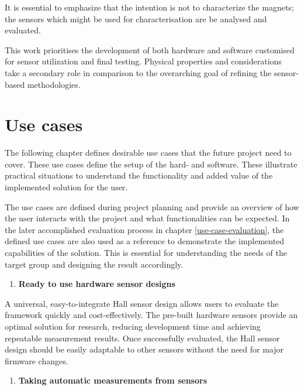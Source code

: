 It is essential to emphasize that the intention is not to characterize
the magnets; the sensors which might be used for characterisation are be
analysed and evaluated.

This work prioritises the development of both hardware and software
customised for sensor utilization and final testing. Physical properties
and considerations take a secondary role in comparison to the
overarching goal of refining the sensor-based methodologies.

\hypertarget{use-cases}{%
\section{Use cases}\label{use-cases}}

The following chapter defines desirable use cases that the future
project need to cover. These use cases define the setup of the hard- and
software. These illustrate practical situations to understand the
functionality and added value of the implemented solution for the user.

The use cases are defined during project planning and provide an
overview of how the user interacts with the project and what
functionalities can be expected. In the later accomplished evaluation
process in chapter \ref{use-case-evaluation}, the defined use cases are
also used as a reference to demonstrate the implemented capabilities of
the solution. This is essential for understanding the needs of the
target group and designing the result accordingly.

\begin{enumerate}
\def\labelenumi{\arabic{enumi}.}
\tightlist
\item
  \textbf{Ready to use hardware sensor designs}
\end{enumerate}

A universal, easy-to-integrate Hall sensor design allows users to
evaluate the framework quickly and cost-effectively. The pre-built
hardware sensors provide an optimal solution for research, reducing
development time and achieving repeatable measurement results. Once
successfully evaluated, the Hall sensor design should be easily
adaptable to other sensors without the need for major firmware changes.

\begin{enumerate}
\def\labelenumi{\arabic{enumi}.}
\setcounter{enumi}{1}
\tightlist
\item
  \textbf{Taking automatic measurements from sensors}
\end{enumerate}

